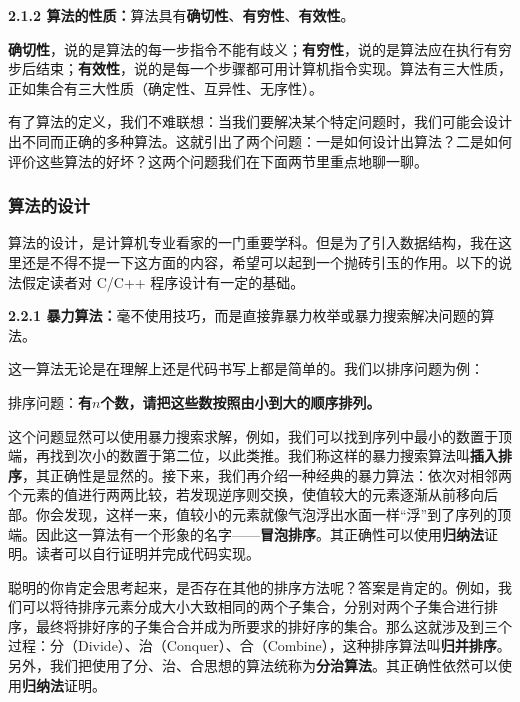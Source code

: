 \documentclass[a5paper]{ctexart}
\begin{document}
		\textbf{2.1.2 算法的性质：}算法具有\textbf{确切性}、\textbf{有穷性}、\textbf{有效性}。
		
		\vspace{12pt}
		
		\textbf{确切性}，说的是算法的每一步指令不能有歧义；\textbf{有穷性}，说的是算法应在执行有穷步后结束；\textbf{有效性}，说的是每一个步骤都可用计算机指令实现。算法有三大性质，正如集合有三大性质（确定性、互异性、无序性）。
		
		有了算法的定义，我们不难联想：当我们要解决某个特定问题时，我们可能会设计出不同而正确的多种算法。这就引出了两个问题：一是如何设计出算法？二是如何评价这些算法的好坏？这两个问题我们在下面两节里重点地聊一聊。
		
		
		\subsubsection{算法的设计}
		
		算法的设计，是计算机专业看家的一门重要学科。但是为了引入数据结构，我在这里还是不得不提一下这方面的内容，希望可以起到一个抛砖引玉的作用。以下的说法假定读者对 C/C++ 程序设计有一定的基础。
		
		\vspace{12pt}
		
		\textbf{2.2.1 暴力算法：}毫不使用技巧，而是直接靠暴力枚举或暴力搜索解决问题的算法。
		
		\vspace{12pt}
		
		这一算法无论是在理解上还是代码书写上都是简单的。我们以排序问题为例：
		
		排序问题：\textbf{有$n$个数，请把这些数按照由小到大的顺序排列。}
		
		这个问题显然可以使用暴力搜索求解，例如，我们可以找到序列中最小的数置于顶端，再找到次小的数置于第二位，以此类推。我们称这样的暴力搜索算法叫\textbf{插入排序}，其正确性是显然的。接下来，我们再介绍一种经典的暴力算法：依次对相邻两个元素的值进行两两比较，若发现逆序则交换，使值较大的元素逐渐从前移向后部。你会发现，这样一来，值较小的元素就像气泡浮出水面一样“浮”到了序列的顶端。因此这一算法有一个形象的名字——\textbf{冒泡排序}。其正确性可以使用\textbf{归纳法}证明。读者可以自行证明并完成代码实现。
		
		聪明的你肯定会思考起来，是否存在其他的排序方法呢？答案是肯定的。例如，我们可以将待排序元素分成大小大致相同的两个子集合，分别对两个子集合进行排序，最终将排好序的子集合合并成为所要求的排好序的集合。那么这就涉及到三个过程：分（Divide）、治（Conquer）、合（Combine），这种排序算法叫\textbf{归并排序}。另外，我们把使用了分、治、合思想的算法统称为\textbf{分治算法}。其正确性依然可以使用\textbf{归纳法}证明。
		
\end{document}
